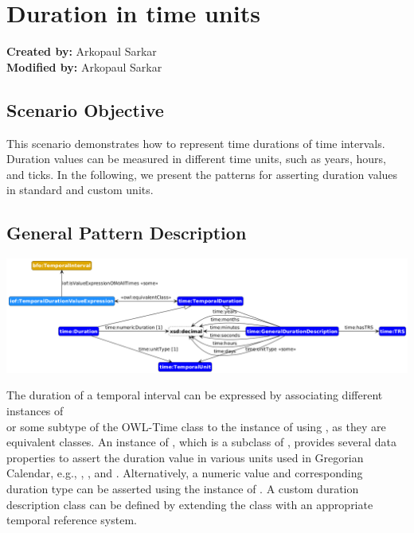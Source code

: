 \section{Duration in time units}
\label{sec-change-location}

\textbf{Created by:} Arkopaul Sarkar \\
\textbf{Modified by:} Arkopaul Sarkar \\

\subsection*{Scenario Objective}

This scenario demonstrates how to represent time durations of time intervals. Duration values can be measured in different time units, such as years, hours, and ticks. In the following, we present the patterns for asserting duration values in standard and custom units.   

\subsection*{General Pattern Description}

\includegraphics[scale=0.36]{scenarios/time-duration/image/time-duration.png}

The duration of a temporal interval can be expressed by associating different instances of \\  or some subtype of the OWL-Time class  to the instance of  using , as they are equivalent classes. An instance of , which is a subclass of , provides several data properties to assert the duration value in various units used in Gregorian Calendar, e.g., , , and . Alternatively, a numeric value and corresponding duration type can be asserted using the instance of . A custom duration description class can be defined by extending the  class with an appropriate temporal reference system. 

